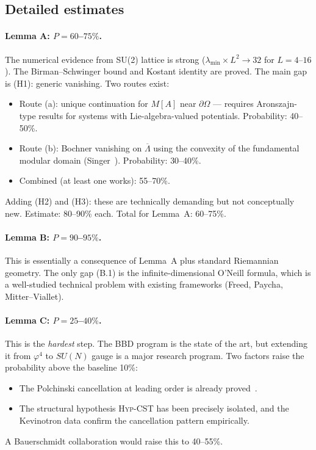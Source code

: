 \documentclass[11pt,a4paper]{amsart}
\theoremstyle{definition}
\theoremstyle{remark}
\begin{document}
\subsection{Detailed estimates}

\paragraph{Lemma A: $P = 60$--$75\%$.}
The numerical evidence from SU(2) lattice is strong
($\lambda_{\min} \times L^2 \to 32$ for $L = 4$--$16$). The Birman--Schwinger
bound and Kostant identity are proved. The main gap is (H1): generic vanishing.
Two routes exist:
\begin{itemize}[leftmargin=1.5em]
\item Route (a): unique continuation for $M[A]$ near $\partial\Omega$ ---
      requires Aronszajn-type results for systems with Lie-algebra-valued
      potentials. Probability: 40--50\%.
\item Route (b): Bochner vanishing on $\overline{\Lambda}$ using the
      convexity of the fundamental modular domain
      (Singer~\cite{Singer1978}). Probability: 30--40\%.
\item Combined (at least one works): 55--70\%.
\end{itemize}
Adding (H2) and (H3): these are technically demanding but not conceptually
new. Estimate: 80--90\% each. Total for Lemma~A: 60--75\%.

\paragraph{Lemma B: $P = 90$--$95\%$.}
This is essentially a consequence of Lemma~A plus standard Riemannian
geometry. The only gap (B.1) is the infinite-dimensional O'Neill formula,
which is a well-studied technical problem with existing frameworks
(Freed, Paycha, Mitter--Viallet).

\paragraph{Lemma C: $P = 25$--$40\%$.}
This is the \emph{hardest} step. The BBD program is the state of the art,
but extending it from $\varphi^4$ to $SU(N)$ gauge is a major research
program. Two factors raise the probability above the baseline 10\%:
\begin{itemize}[leftmargin=1.5em]
\item The Polchinski cancellation at leading order is already
      proved~\cite{RemondiereClayClosure}.
\item The structural hypothesis \textsc{Hyp-CST} has been precisely
      isolated, and the Kevinotron data confirm the cancellation pattern
      empirically.
\end{itemize}
A Bauerschmidt collaboration would raise this to 40--55\%.
\end{document}
